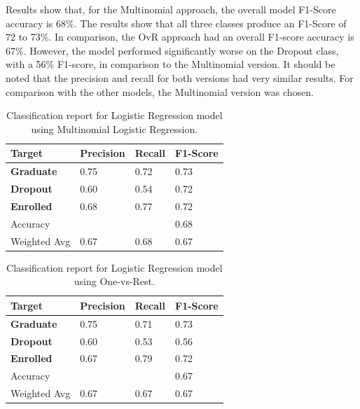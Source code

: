 \documentclass[12pt]{article}
\begin{document}
Results show that, for the Multinomial approach, the overall model F1-Score accuracy is 68\%. The results show that all three classes produce an F1-Score of 72 to 73\%. In comparison, the OvR approach had an overall F1-score accuracy is 67\%. However, the model performed significantly worse on the Dropout class, with a 56\% F1-score, in comparison to the Multinomial version. It should be noted that the precision and recall for both versions had very similar results. For comparison with the other models, the Multinomial version was chosen.
 
\begin{table}[h!]
  \renewcommand{\arraystretch}{1.2} %
  \centering
  \begin{tabular}{ | m{2.5cm} || m{2cm} | m{2cm} | m{2cm} | } 
    \hline
    \textbf{Target} & \textbf{Precision} & \textbf{Recall} & \textbf{F1-Score} \\ 
    \hline
    \hline
    \textbf{Graduate} & 0.75 & 0.72 & 0.73 \\ 
    \hline
    \textbf{Dropout} & 0.60 & 0.54 & 0.72 \\ 
    \hline
    \textbf{Enrolled} & 0.68 & 0.77 & 0.72 \\
    \hline
    \hline
    Accuracy & \- & \- & 0.68 \\
    \hline
    Weighted Avg & 0.67 & 0.68 & 0.67 \\
    \hline
  \end{tabular}
  \caption{Classification report for Logistic Regression model using Multinomial Logistic Regression.}
  \label{tab:logist_multinomial}
\end{table}

\begin{table}[h!]
  \renewcommand{\arraystretch}{1.2} %
  \centering
  \begin{tabular}{ | m{2.5cm} || m{2cm} | m{2cm} | m{2cm} | } 
    \hline
    \textbf{Target} & \textbf{Precision} & \textbf{Recall} & \textbf{F1-Score} \\ 
    \hline
    \hline
    \textbf{Graduate} & 0.75 & 0.71 & 0.73 \\ 
    \hline
    \textbf{Dropout} & 0.60 & 0.53 & 0.56 \\ 
    \hline
    \textbf{Enrolled} & 0.67 & 0.79 & 0.72 \\
    \hline
    \hline
    Accuracy & \- & \- & 0.67 \\
    \hline
    Weighted Avg & 0.67 & 0.67 & 0.67 \\
    \hline
  \end{tabular}
  \caption{Classification report for Logistic Regression model using One-vs-Rest.}
  \label{tab:logist_ovr}
\end{table}

\printbibliography[heading=bibintoc, title={References}]
\end{document}
